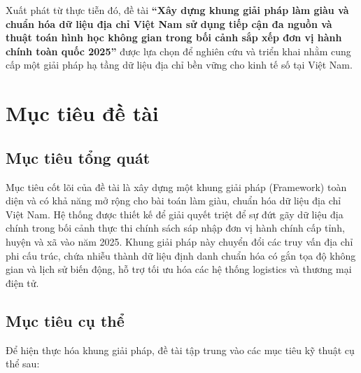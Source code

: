 Xuất phát từ thực tiễn đó, đề tài \textbf{“Xây dựng khung giải pháp làm giàu và chuẩn hóa dữ liệu địa chỉ Việt Nam sử dụng tiếp cận đa nguồn và thuật toán hình học không gian trong bối cảnh sắp xếp đơn vị hành chính toàn quốc 2025”} được lựa chọn để nghiên cứu và triển khai nhằm cung cấp một giải pháp hạ tầng dữ liệu địa chỉ bền vững cho kinh tế số tại Việt Nam.

\section{Mục tiêu đề tài}
\label{sec:goals}

\subsection{Mục tiêu tổng quát}
Mục tiêu cốt lõi của đề tài là xây dựng một khung giải pháp (Framework) toàn diện và có khả năng mở rộng cho bài toán làm giàu, chuẩn hóa dữ liệu địa chỉ Việt Nam. Hệ thống được thiết kế để giải quyết triệt để sự đứt gãy dữ liệu địa chính trong bối cảnh thực thi chính sách sáp nhập đơn vị hành chính cấp tỉnh, huyện và xã vào năm 2025. Khung giải pháp này chuyển đổi các truy vấn địa chỉ phi cấu trúc, chứa nhiễu thành dữ liệu định danh chuẩn hóa có gắn tọa độ không gian và lịch sử biến động, hỗ trợ tối ưu hóa các hệ thống logistics và thương mại điện tử.

\subsection{Mục tiêu cụ thể}

Để hiện thực hóa khung giải pháp, đề tài tập trung vào các mục tiêu kỹ thuật cụ thể sau:

